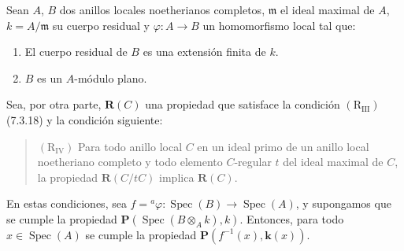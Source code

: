 \begin{theorem}[7.5.1]
\label{IV.2.s7.5.1-fr}
Sean $A$, $B$ dos anillos locales noetherianos \textup{completos}, $\mathfrak m$
el ideal maximal de $A$, $k=A/\mathfrak m$ su cuerpo residual y
$\varphi:A\to B$ un homomorfismo local tal que:
\begin{enumerate}
\item[\emph{(i)}] El cuerpo residual de $B$ es una extensión finita de
$k$.
\item[\emph{(ii)}] $B$ es un $A$-módulo plano.
\end{enumerate}
Sea, por otra parte, $\boldsymbol R(C)$ una propiedad que satisface la
condición $(\mathrm R_{\mathrm{III}})$ (7.3.18) y la condición siguiente:
\begin{quote}
$(\mathrm R_{\mathrm{IV}})$ Para todo anillo local $C$ en un ideal primo
de un anillo local noetheriano completo y todo elemento $C$-regular $t$
del ideal maximal de $C$, la propiedad $\boldsymbol R(C/tC)$ implica
$\boldsymbol R(C)$.
\end{quote}


En estas condiciones, sea $f={}^a\varphi:\operatorname{Spec}(B)\to
\operatorname{Spec}(A)$, y supongamos que se cumple la propiedad
$\boldsymbol P(\operatorname{Spec}(B\otimes_A k),k)$. Entonces, para
todo $x\in\operatorname{Spec}(A)$ se cumple la propiedad
$\boldsymbol P(f^{-1}(x),\boldsymbol{k}(x))$.
\end{theorem}
